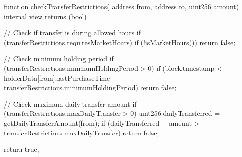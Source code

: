\documentclass[12pt]{article}
\begin{document}
function checkTransferRestrictions(    address from,    address to,    uint256 amount) internal view returns (bool) {    // Check if transfer is during allowed hours    if (transferRestrictions.requiresMarketHours) {        if (!isMarketHours()) {            return false;        }    }

    // Check minimum holding period    if (transferRestrictions.minimumHoldingPeriod > 0) {        if (block.timestamp < holderData[from].lastPurchaseTime + transferRestrictions.minimumHoldingPeriod) {            return false;        }    }

    // Check maximum daily transfer amount    if (transferRestrictions.maxDailyTransfer > 0) {        uint256 dailyTransferred = getDailyTransferAmount(from);        if (dailyTransferred + amount > transferRestrictions.maxDailyTransfer) {            return false;        }    }

    return true;}
\end{document}
